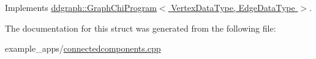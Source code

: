 Implements \hyperlink{classddgraph_1_1_graph_chi_program_ad76f8881627e3c039144e261bfc77770}{ddgraph\-::\-Graph\-Chi\-Program$<$ Vertex\-Data\-Type, Edge\-Data\-Type $>$}.



The documentation for this struct was generated from the following file\-:\begin{DoxyCompactItemize}
\item 
example\-\_\-apps/\hyperlink{connectedcomponents_8cpp}{connectedcomponents.\-cpp}\end{DoxyCompactItemize}
